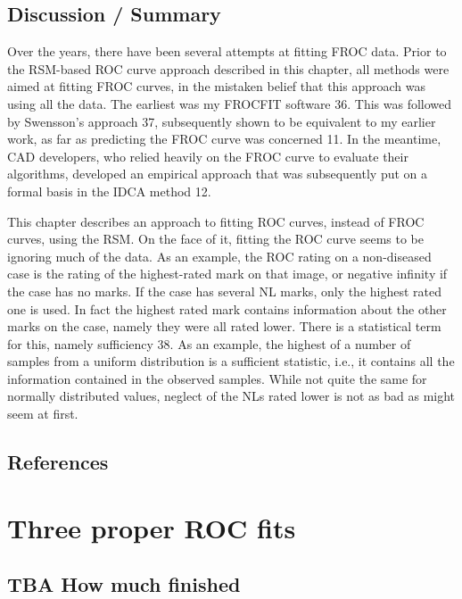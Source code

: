 \documentclass[
]{book}
\begin{document}
\hypertarget{rsm-fitting-discussion-summary}{%
\section{Discussion / Summary}\label{rsm-fitting-discussion-summary}}

Over the years, there have been several attempts at fitting FROC data. Prior to the RSM-based ROC curve approach described in this chapter, all methods were aimed at fitting FROC curves, in the mistaken belief that this approach was using all the data. The earliest was my FROCFIT software 36. This was followed by Swensson's approach 37, subsequently shown to be equivalent to my earlier work, as far as predicting the FROC curve was concerned 11. In the meantime, CAD developers, who relied heavily on the FROC curve to evaluate their algorithms, developed an empirical approach that was subsequently put on a formal basis in the IDCA method 12.

This chapter describes an approach to fitting ROC curves, instead of FROC curves, using the RSM. On the face of it, fitting the ROC curve seems to be ignoring much of the data. As an example, the ROC rating on a non-diseased case is the rating of the highest-rated mark on that image, or negative infinity if the case has no marks. If the case has several NL marks, only the highest rated one is used. In fact the highest rated mark contains information about the other marks on the case, namely they were all rated lower. There is a statistical term for this, namely sufficiency 38. As an example, the highest of a number of samples from a uniform distribution is a sufficient statistic, i.e., it contains all the information contained in the observed samples. While not quite the same for normally distributed values, neglect of the NLs rated lower is not as bad as might seem at first.

\hypertarget{rsm-fitting-references}{%
\section{References}\label{rsm-fitting-references}}

\hypertarget{rsm-3-fits}{%
\chapter{Three proper ROC fits}\label{rsm-3-fits}}

\hypertarget{rsm-3-fits-how-much-finished}{%
\section{TBA How much finished}\label{rsm-3-fits-how-much-finished}}
\end{document}
